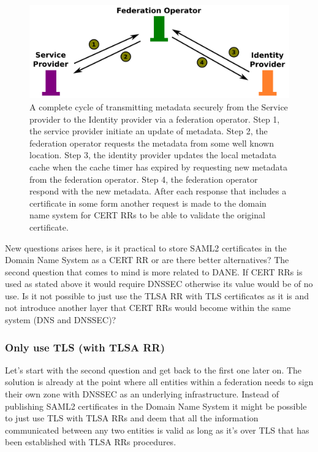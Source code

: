 \begin{figure}[ht]
\begin{center}
\includegraphics[scale=1]{Figures/saml2certsascertrr.png}
\end{center}
\caption{A complete cycle of transmitting metadata securely from the Service provider to the Identity provider via a federation operator.
Step 1, the service provider initiate an update of metadata.
Step 2, the federation operator requests the metadata from some well known location.
Step 3, the identity provider updates the local metadata cache when the cache timer has expired by requesting new metadata from the federation operator.
Step 4, the federation operator respond with the new metadata.
After each response that includes a certificate in some form another request is made to the domain name system for CERT RRs to be able to validate the original certificate. 
\label{ch4:saml2certsascertrr}}
\end{figure}



New questions arises here, is it practical to store SAML2 certificates in the Domain Name System as a CERT RR 
or are there better alternatives?
The second question that comes to mind is more related to DANE.
If CERT RRs is used as stated above it would require DNSSEC otherwise its value would be of no use.
Is it not possible to just use the TLSA RR with TLS certificates as it is and not introduce another layer that CERT RRs would become within the same system (DNS and DNSSEC)?

\subsubsection{Only use TLS (with TLSA RR)}
\label{subsec:only-tlsa-rr-with-tls}
Let's start with the second question and get back to the first one later on.
The solution is already at the point where all entities within a federation needs to sign their own zone with DNSSEC as an underlying infrastructure.
Instead of publishing SAML2 certificates in the Domain Name System it might be possible to just use TLS with TLSA RRs and deem that all the information communicated between any two entities is valid as long as it's over TLS that has been established with TLSA RRs procedures.

